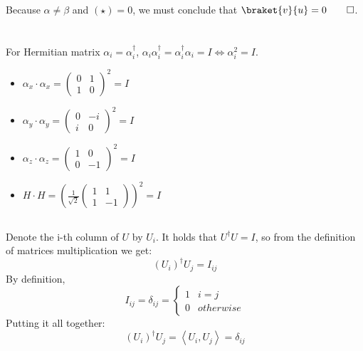 \documentclass[a4paper,10pt]{hw}
\begin{document}
Because $\alpha \neq \beta$ and $\left(\star\right) = 0$, we must conclude that $\braket{v}{u} = 0 \qed$.

\section{}

\subsection{}

For Hermitian matrix $\alpha_i = \alpha_i^\dagger$, $\alpha_i\alpha_i^\dagger = \alpha_i^\dagger\alpha_i = I \iff \alpha_i^2 = I$. 

\begin{itemize}

\item $\alpha_x\cdot\alpha_x = \begin{pmatrix} 0 & 1 \\ 1 & 0 \end{pmatrix}^2 = I$
\item $\alpha_y\cdot\alpha_y = \begin{pmatrix} 0 & -i \\ i & 0 \end{pmatrix}^2 = I$
\item $\alpha_z\cdot\alpha_z = \begin{pmatrix} 1 & 0 \\ 0 & -1 \end{pmatrix}^2 = I$
\item $H \cdot H = \left(\frac{1}{\sqrt{2}}\begin{pmatrix} 1 & 1 \\ 1 & -1 \end{pmatrix}\right)^2 = I$

\end{itemize}

\subsection{} \label{question 4.2}


Denote the i-th column of $U$ by $U_i$. It holds that $U^\dagger U = I$, so from the definition of matrices multiplication we get: 
$$(U_i)^\dagger U_j = I_{ij}$$ 
By definition, 
$$I_{ij} = \delta_{ij} = \begin{cases} 1 & i=j \\ 0 & otherwise \end{cases}$$
Putting it all together:
$$(U_i)^\dagger U_j = \left\langle U_i, U_j\right\rangle = \delta_{ij}$$
\end{document}
